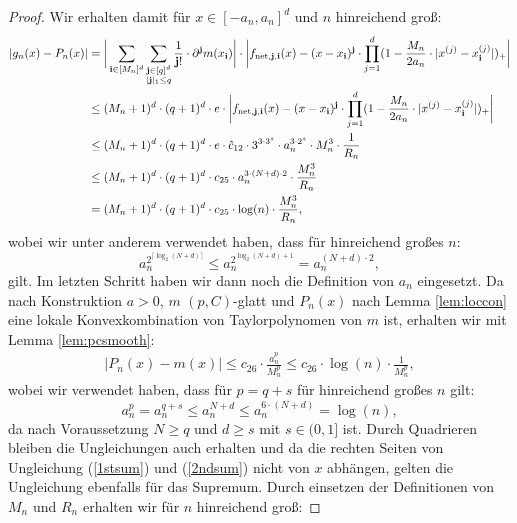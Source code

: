 \begin{proof}
Wir erhalten damit für $x \in [-a_n ,a_n]^d$ und $n$ hinreichend groß:
\begin{equation}
\label{1stsum}
\begin{split}
 |g_n(x) - P_n(x)| 
& = \bigg| \sum_{\mathbf{i} \in [M_n]^d} \sum_{\substack{ \mathbf{j} \in [q]^d \\ |\mathbf{j}|_1 \leq q}} \frac{1}{\mathbf{j}!} \cdot \partial^{\mathbf{j}} m (x_{\mathbf{i}}) \bigg| \cdot \bigg| f_{\mathrm{net},\mathbf{j},\mathbf{i}}(x) - (x - x_{\mathbf{i}})^{\mathbf{j}} \cdot \prod_{j = 1}^d(1 - \frac{M_n}{2a_n} \cdot |x^{(j)} - x_{\mathbf{i}}^{(j)}|)_+ \bigg| \\
& \leq (M_n + 1)^d \cdot (q + 1)^d \cdot e \cdot \bigg| f_{\mathrm{net},\mathbf{j},\mathbf{i}}(x) - (x - x_{\mathbf{i}})^{\mathbf{j}} \cdot \prod_{j = 1}^d(1 - \frac{M_n}{2a_n} \cdot |x^{(j)} - x_{\mathbf{i}}^{(j)}|)_+ \bigg| \\
& \leq (M_n + 1)^d \cdot (q + 1)^d \cdot e \cdot \hat{c}_{12} \cdot 3^{3 \cdot 3^s} \cdot a_n^{3 \cdot 2^s} \cdot M_n^3 \cdot \frac{1}{R_n} \\
& \leq (M_n + 1)^d \cdot (q + 1)^d \cdot c_{25}\cdot a_n^{3 \cdot (N + d) \cdot 2} \cdot \frac{M_n^3}{R_n} \\
& =  (M_n + 1)^d \cdot (q + 1)^d \cdot c_{25}\cdot \log(n) \cdot \frac{M_n^3}{R_n},
\end{split}
\end{equation}
wobei wir unter anderem verwendet haben, dass für hinreichend großes $n$:
$$a_n^{2^{\lceil\log_2(N + d)\rceil}} \leq a_n^{2^{\log_2(N + d) + 1}} = a_n^{(N + d) \cdot 2},$$ gilt. Im letzten Schritt haben wir dann noch die Definition von $a_n$ eingesetzt. 
Da nach Konstruktion $a > 0$, $m$ $(p, C)$-glatt und $P_n(x)$ nach Lemma \ref{lem:loccon} eine lokale Konvexkombination von Taylorpolynomen von $m$ ist, erhalten wir mit Lemma \ref{lem:pcsmooth}:
\begin{equation}
\label{2ndsum}
\begin{split}
|P_n(x) - m(x)| \leq c_{26} \cdot \frac{a_n^p}{M_n^p} \leq c_{26} \cdot \log(n) \cdot \frac{1}{M_n^p} , 
\end{split}
\end{equation}
wobei wir verwendet haben, dass für $p = q + s$ für hinreichend großes $n$ gilt:
$$a_n^p = a_n^{q + s} \leq a_n^{N + d} \leq a_n^{6 \cdot (N + d)} = \log(n),$$
da nach Voraussetzung $N \geq q$ und $d \geq s$ mit $s \in (0, 1]$ ist.
Durch Quadrieren bleiben die Ungleichungen auch erhalten und da die rechten Seiten von Ungleichung (\ref{1stsum}) und (\ref{2ndsum}) nicht von $x$ abhängen, gelten die Ungleichung ebenfalls für das Supremum.   Durch einsetzen der Definitionen von $M_n$ und $R_n$ erhalten wir für $n$ hinreichend groß:

\end{proof}
